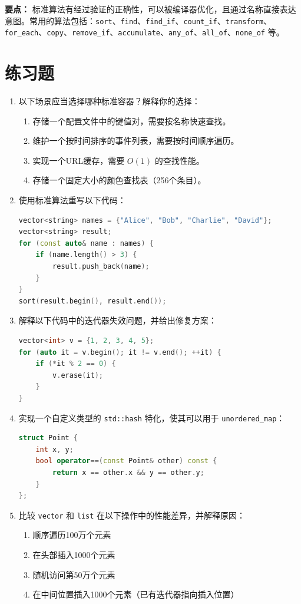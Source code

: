 \textbf{要点：} 标准算法有经过验证的正确性，可以被编译器优化，且通过名称直接表达意图。常用的算法包括：\texttt{sort}、\texttt{find}、\texttt{find\_if}、\texttt{count\_if}、\texttt{transform}、\texttt{for\_each}、\texttt{copy}、\texttt{remove\_if}、\texttt{accumulate}、\texttt{any\_of}、\texttt{all\_of}、\texttt{none\_of} 等。

\section*{练习题}

\begin{enumerate}
\item 以下场景应当选择哪种标准容器？解释你的选择：
\begin{enumerate}
\item 存储一个配置文件中的键值对，需要按名称快速查找。
\item 维护一个按时间排序的事件列表，需要按时间顺序遍历。
\item 实现一个URL缓存，需要 $O(1)$ 的查找性能。
\item 存储一个固定大小的颜色查找表（256个条目）。
\end{enumerate}

\item 使用标准算法重写以下代码：
\begin{lstlisting}[language=C++]
vector<string> names = {"Alice", "Bob", "Charlie", "David"};
vector<string> result;
for (const auto& name : names) {
    if (name.length() > 3) {
        result.push_back(name);
    }
}
sort(result.begin(), result.end());
\end{lstlisting}

\item 解释以下代码中的迭代器失效问题，并给出修复方案：
\begin{lstlisting}[language=C++]
vector<int> v = {1, 2, 3, 4, 5};
for (auto it = v.begin(); it != v.end(); ++it) {
    if (*it % 2 == 0) {
        v.erase(it);
    }
}
\end{lstlisting}

\item 实现一个自定义类型的 \texttt{std::hash} 特化，使其可以用于 \texttt{unordered\_map}：
\begin{lstlisting}[language=C++]
struct Point {
    int x, y;
    bool operator==(const Point& other) const {
        return x == other.x && y == other.y;
    }
};
\end{lstlisting}

\item 比较 \texttt{vector} 和 \texttt{list} 在以下操作中的性能差异，并解释原因：
\begin{enumerate}
\item 顺序遍历100万个元素
\item 在头部插入1000个元素
\item 随机访问第50万个元素
\item 在中间位置插入1000个元素（已有迭代器指向插入位置）
\end{enumerate}
\end{enumerate}
